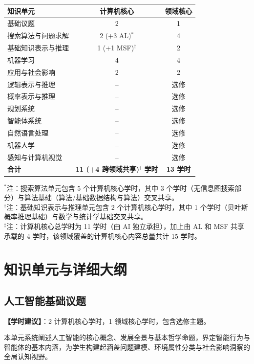 \begin{table}[H]
\centering
\setlength{\tabcolsep}{3.5pt}\fontsize{8pt}{9.6pt}\selectfont\begin{tabularx}{\columnwidth}{Y c c}
\toprule
\textbf{知识单元} & \textbf{计算机核心} & \textbf{领域核心} \\
\midrule
基础议题 & 2 & 1 \\
搜索算法与问题求解 & 2 (+3 AL)$^*$ & 4 \\
基础知识表示与推理 & 1 (+1 MSF)$^\dagger$ & 2 \\
机器学习 & 4 & 4 \\
应用与社会影响 & 2 & 2 \\
逻辑表示与推理 & -- & 选修 \\
概率表示与推理 & -- & 选修 \\
规划系统 & -- & 选修 \\
智能体系统 & -- & 选修 \\
自然语言处理 & -- & 选修 \\
机器人学 & -- & 选修 \\
感知与计算机视觉 & -- & 选修 \\
\midrule
\textbf{合计} & \textbf{11 (+4 跨领域共享)$^\ddagger$ 学时} & \textbf{13 学时} \\
\bottomrule
\end{tabularx}
\begin{flushleft}\footnotesize
$^*$注：搜索算法单元包含 5 个计算机核心学时，其中 3 个学时（无信息图搜索部分）与算法基础（算法/基础数据结构与算法）交叉共享。\\
$^\dagger$注：基础知识表示与推理单元包含 2 个计算机核心学时，其中 1 个学时（贝叶斯概率推理基础）与数学与统计学基础交叉共享。\\
$^\ddagger$注：计算机核心总学时为 11 学时（由 AI 独立承担），加上由 AL 和 MSF 共享承载的 4 学时，该领域覆盖的计算机核心内容总量共计 15 学时。
\end{flushleft}
\end{table}

\section{知识单元与详细大纲}

\subsection{人工智能基础议题}
\textbf{【学时建议】}：2 计算机核心学时，1 领域核心学时，包含选修主题。

本单元系统阐述人工智能的核心概念、发展全景与基本哲学命题，界定智能行为与智能体的基本内涵，为学生构建起涵盖问题建模、环境属性分类与社会影响洞察的全局认知视野。


